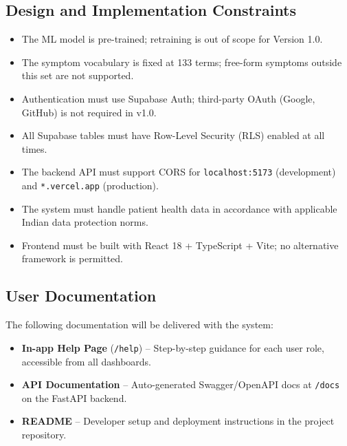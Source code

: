 \documentclass[12pt,a4paper]{article}
\begin{document}
\subsection{Design and Implementation Constraints}
\begin{itemize}
    \item The ML model is pre-trained; retraining is out of scope for Version 1.0.
    \item The symptom vocabulary is fixed at 133 terms; free-form symptoms outside this set are not supported.
    \item Authentication must use Supabase Auth; third-party OAuth (Google, GitHub) is not required in v1.0.
    \item All Supabase tables must have Row-Level Security (RLS) enabled at all times.
    \item The backend API must support CORS for \texttt{localhost:5173} (development) and \texttt{*.vercel.app} (production).
    \item The system must handle patient health data in accordance with applicable Indian data protection norms.
    \item Frontend must be built with React 18 + TypeScript + Vite; no alternative framework is permitted.
\end{itemize}

\subsection{User Documentation}
The following documentation will be delivered with the system:
\begin{itemize}
    \item \textbf{In-app Help Page} (\texttt{/help}) -- Step-by-step guidance for each user role, accessible from all dashboards.
    \item \textbf{API Documentation} -- Auto-generated Swagger/OpenAPI docs at \texttt{/docs} on the FastAPI backend.
    \item \textbf{README} -- Developer setup and deployment instructions in the project repository.
\end{itemize}
\end{document}
